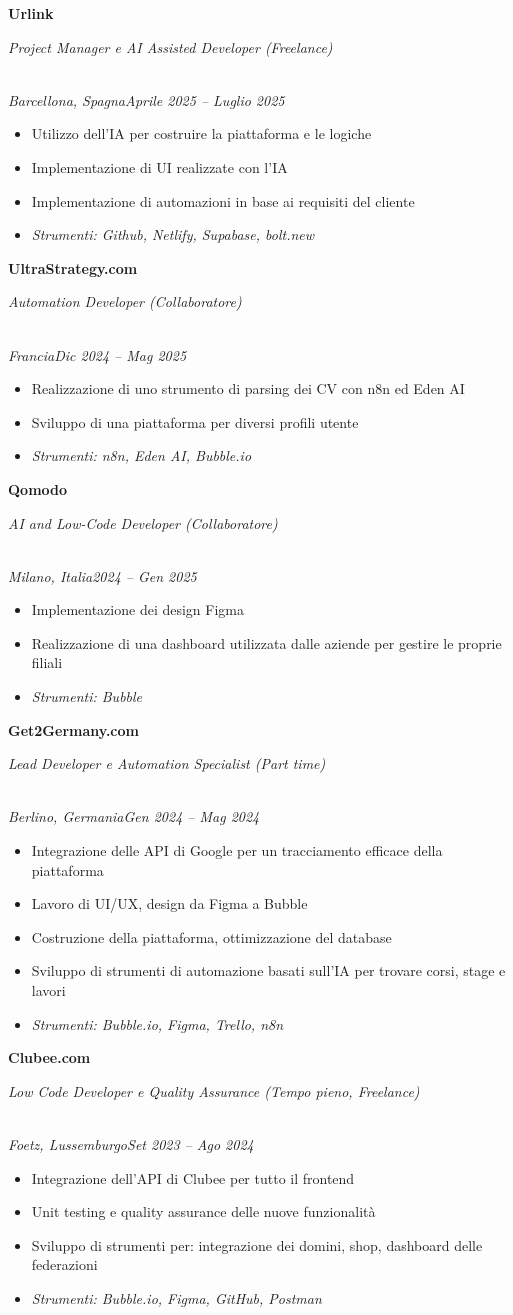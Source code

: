 \documentclass[a4paper,10pt]{article}
\newcommand{\role}[4]{\vspace{3pt}\noindent\hspace{0.6em}\parbox[t]{0.38\textwidth}{\raggedright\textbf{#1}}\hfill\parbox[t]{0.58\textwidth}{\raggedleft\textit{#2}}\\{\textit{#3}\hfill\textit{#4}}\vspace{1pt}}
\begin{document}
\role{Urlink}{Project Manager e AI Assisted Developer (Freelance)}{Barcellona, Spagna}{Aprile 2025 -- Luglio 2025}
\begin{itemize}
\item Utilizzo dell'IA per costruire la piattaforma e le logiche
\item Implementazione di UI realizzate con l'IA
\item Implementazione di automazioni in base ai requisiti del cliente
\item \textit{Strumenti: Github, Netlify, Supabase, bolt.new}
\end{itemize}

\role{UltraStrategy.com}{Automation Developer (Collaboratore)}{Francia}{Dic 2024 -- Mag 2025}
\begin{itemize}
\item Realizzazione di uno strumento di parsing dei CV con n8n ed Eden AI
\item Sviluppo di una piattaforma per diversi profili utente
\item \textit{Strumenti: n8n, Eden AI, Bubble.io}
\end{itemize}

\role{Qomodo}{AI and Low-Code Developer (Collaboratore)}{Milano, Italia}{2024 -- Gen 2025}
\begin{itemize}
\item Implementazione dei design Figma
\item Realizzazione di una dashboard utilizzata dalle aziende per gestire le proprie filiali
\item \textit{Strumenti: Bubble}
\end{itemize}

\role{Get2Germany.com}{Lead Developer e Automation Specialist (Part time)}{Berlino, Germania}{Gen 2024 -- Mag 2024}
\begin{itemize}
\item Integrazione delle API di Google per un tracciamento efficace della piattaforma
\item Lavoro di UI/UX, design da Figma a Bubble
\item Costruzione della piattaforma, ottimizzazione del database
\item Sviluppo di strumenti di automazione basati sull'IA per trovare corsi, stage e lavori
\item \textit{Strumenti: Bubble.io, Figma, Trello, n8n}
\end{itemize}

\role{Clubee.com}{Low Code Developer e Quality Assurance (Tempo pieno, Freelance)}{Foetz, Lussemburgo}{Set 2023 -- Ago 2024}
\begin{itemize}
\item Integrazione dell'API di Clubee per tutto il frontend
\item Unit testing e quality assurance delle nuove funzionalit\`a
\item Sviluppo di strumenti per: integrazione dei domini, shop, dashboard delle federazioni
\item \textit{Strumenti: Bubble.io, Figma, GitHub, Postman}
\end{itemize}
\end{document}
